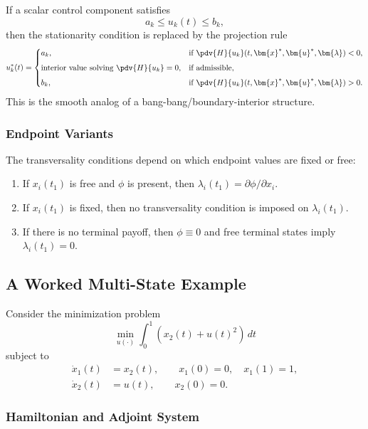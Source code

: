 \documentclass[11pt]{article}
\theoremstyle{definition}
\newcommand{\x}{\bm{x}}
\newcommand{\uvec}{\bm{u}}
\newcommand{\lam}{\bm{\lambda}}
\begin{document}
If a scalar control component satisfies
\[
a_k \le u_k(t)\le b_k,
\]
then the stationarity condition is replaced by the projection rule
\[
u_k^*(t)=
\begin{cases}
a_k, & \text{if } \displaystyle \pdv{H}{u_k}(t,\x^*,\uvec^*,\lam)<0,\\[1ex]
\text{interior value solving } \displaystyle \pdv{H}{u_k}=0, & \text{if admissible},\\[1ex]
b_k, & \text{if } \displaystyle \pdv{H}{u_k}(t,\x^*,\uvec^*,\lam)>0.
\end{cases}
\]
This is the smooth analog of a bang-bang/boundary-interior structure.

\subsubsection{Endpoint Variants}

The transversality conditions depend on which endpoint values are fixed or free:

\begin{enumerate}[label=(\roman*)]
    \item If $x_i(t_1)$ is free and $\phi$ is present, then $\lambda_i(t_1)=\partial \phi/\partial x_i$.
    \item If $x_i(t_1)$ is fixed, then no transversality condition is imposed on $\lambda_i(t_1)$.
    \item If there is no terminal payoff, then $\phi\equiv 0$ and free terminal states imply $\lambda_i(t_1)=0$.
\end{enumerate}

\subsection{A Worked Multi-State Example}

Consider the minimization problem
\begin{equation}
\min_{u(\cdot)} \int_0^1 \left( x_2(t)+u(t)^2 \right)\,dt
\end{equation}
subject to
\begin{align}
\dot{x}_1(t) &= x_2(t), \qquad x_1(0)=0,\quad x_1(1)=1,\\
\dot{x}_2(t) &= u(t), \qquad x_2(0)=0.
\end{align}

\subsubsection{Hamiltonian and Adjoint System}
\end{document}
